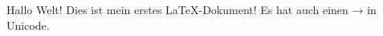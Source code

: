 \documentclass[a4paper]{scrartcl}
\begin{document}
Hallo Welt!
Dies ist mein erstes LaTeX-Dokument!
Es hat auch einen → in Unicode.
\end{document}
